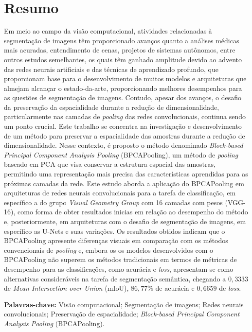 \section*{Resumo}
\thispagestyle{empty}
\makeatletter
\makeatother
Em meio ao campo da visão computacional, atividades relacionadas à segmentação de imagens têm proporcionado avanços quanto a análises médicas mais acuradas, entendimento de cenas, projetos de sistemas autônomos, entre outros estudos semelhantes, os quais têm ganhado amplitude devido ao advento das redes neurais artificiais e das técnicas de aprendizado profundo, que proporcionam base para o desenvolvimento de muitos modelos e arquiteturas que almejam alcançar o estado-da-arte, proporcionando melhores desempenhos para as questões de segmentação de imagens.
Contudo, apesar dos avanços, o desafio da preservação da espacialidade durante a redução de dimensionalidade, particularmente nas camadas de \textit{pooling} das redes convolucionais, continua sendo um ponto crucial. Este trabalho se concentra na investigação e desenvolvimento de um método para preservar a espacialidade das amostras durante a redução de dimensionalidade. Nesse contexto, é proposto o método denominado \textit{Block-based Principal Component Analysis Pooling} (BPCAPooling), um método de \textit{pooling} baseado em PCA que visa conservar a estrutura espacial das amostras, permitindo uma representação mais precisa das características aprendidas para as próximas camadas da rede.
Este estudo aborda a aplicação do BPCAPooling em arquiteturas de redes neurais convolucionais para a tarefa de classificação, em específico a do grupo \textit{Visual Geometry Group} com 16 camadas com pesos (VGG-16), como forma de obter resultados inicias em relação ao desempenho do método e, posteriormente, em arquiteturas com o desafio de segmentação de imagens, em específico as U-Nets e suas variações. Os resultados obtidos indicam que o BPCAPooling apresente diferenças visuais em comparação com os métodos convencionais de \textit{pooling} e, embora os os modelos desenvolvidos com o BPCAPooling não superem os métodos tradicionais em termos de métricas de desempenho para as classificações, como acurácia e \textit{loss}, apresentam-se como alternativas consideráveis na tarefa de segmentação semântica, chegando a $0,3333$ de \textit{Mean Intersection over Union} (mIoU), $86,77\%$ de acurácia e $0,6659$ de \textit{loss}.

\textbf{Palavras-chave:} Visão computacional; Segmentação de imagens; Redes neurais convolucionais; Preservação de espacialidade; \textit{Block-based Principal Component Analysis Pooling} (BPCAPooling).
